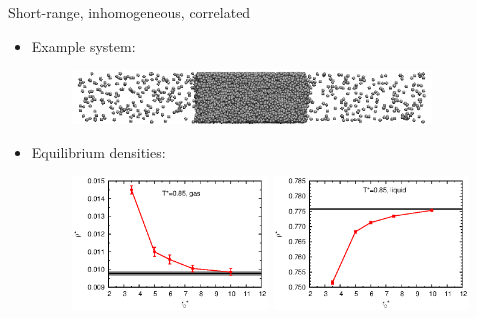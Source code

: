 \documentclass{beamer}
\begin{document}
\begin{frame}{Short-range, inhomogeneous, correlated}
  \begin{itemize}\itemsep 10pt
  \item<1-> Example system:
    \begin{figure}
      \centering
      \includegraphics[width=0.9\textwidth]{figs/t0.85-n16000-rc07.5uni/confout-02.eps}
    \end{figure}
  \item<2-> Equilibrium densities:
    \begin{figure}
    \centering
    \includegraphics[width=0.49\textwidth]{figs/converge.new/t0p85-gas-1.eps} 
    \includegraphics[width=0.49\textwidth]{figs/converge.new/t0p85-liquid-1.eps} 
  \end{figure}  
  \end{itemize}
\end{frame}
\end{document}
